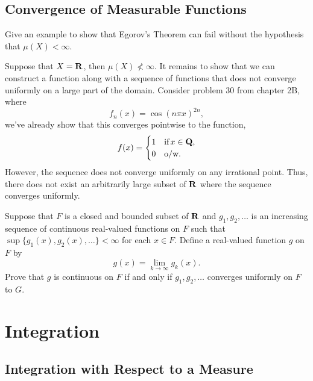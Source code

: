 \documentclass[11pt,oneside]{book}
\begin{document}
\section{Convergence of Measurable Functions}
\begin{exercise}
    Give an example to show that Egorov's Theorem can fail without the hypothesis that $\mu(X) < \infty$.
\end{exercise}
\begin{solution}
    Suppose that $X = \mathbf{R}$, then $\mu(X) \not< \infty$. It remains to
    show that we can construct a function along with a sequence of functions
    that does not converge uniformly on a large part of the domain. Consider
    problem 30 from chapter 2B, where 
    \[
        f_n(x) = \cos(n\pi x)^{2n},    
    \]
    we've already show that this converges pointwise to the function,
    \[
        f(x) = \begin{cases} 1 &\text{if}\, x\in\mathbf{Q}, \\ 0&\text{o/w.}\end{cases}  
    \]
    However, the sequence does not converge uniformly on any irrational point.
    Thus, there does not exist an arbitrarily large subset of $\mathbf{R}$ where the
    sequence converges uniformly. 
\end{solution}

\begin{exercise}
    Suppose that $F$ is a closed and bounded subset of $\mathbf{R}$ and $g_1,g_2,\ldots$ is an increasing sequence of continuous real-valued functions on $F$ such that $\sup\{g_1(x), g_2(x),\ldots\} < \infty$ for each $x \in F$. Define a real-valued function $g$ on $F$ by \[
        g(x) = \lim_{k\to\infty} g_k(x).
    \]
    Prove that $g$ is continuous on $F$ if and only if $g_1,g_2,\ldots$ converges uniformly on $F$ to $G$.
\end{exercise}
\begin{solution}
    
\end{solution}





\chapter{Integration}


\section{Integration with Respect to a Measure}
\end{document}
